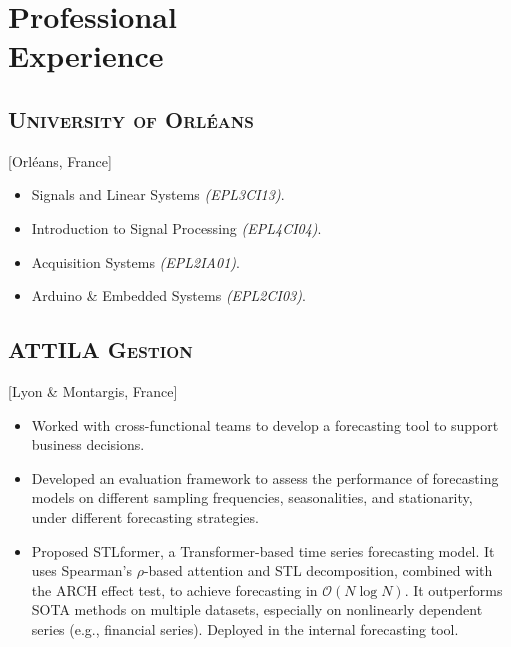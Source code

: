 \documentclass{mycv}
\begin{document}
\section{Professional \\ Experience}

\subsection{\large \scshape University of Orl\'eans}[Orl\'eans, France]

\begin{positions}
\end{positions}

\begin{itemize}
  \itemsep 0em
  \item Signals and Linear Systems \textit{(EPL3CI13)}.
  \item Introduction to Signal Processing \textit{(EPL4CI04)}.
  \item Acquisition Systems \textit{(EPL2IA01)}.
  \item Arduino \& Embedded Systems \textit{(EPL2CI03)}.
\end{itemize}

\vspace{-\parskip}

\subsection{\large \scshape ATTILA Gestion}[Lyon \& Montargis, France]

\begin{positions}
\end{positions}

\begin{itemize}
  \itemsep 0em
  \item Worked with cross-functional teams to develop a forecasting tool to support business decisions.
  \item Developed an evaluation framework to assess the performance of forecasting models on different sampling frequencies, seasonalities, and stationarity, under different forecasting strategies.
  \item Proposed STLformer, a Transformer-based time series forecasting model. It uses Spearman's $\rho$-based attention and STL decomposition, combined with the ARCH effect test, to achieve forecasting in $\mathcal{O}(N \log{N})$. It outperforms SOTA methods on multiple datasets, especially on nonlinearly dependent series (e.g., financial series). Deployed in the internal forecasting tool.
\end{itemize}
\end{document}

